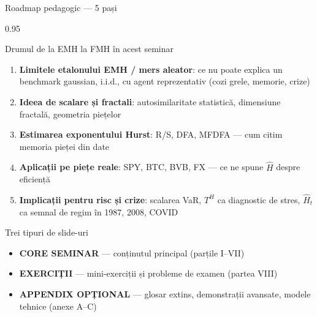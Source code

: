 \documentclass[9pt, aspectratio=169, t]{beamer}
\begin{document}
\begin{frame}[shrink=15]{Roadmap pedagogic --- 5 pași}
\begin{cminipage}{0.95\textwidth}
\begin{block}{Drumul de la EMH la FMH în acest seminar}
\begin{enumerate}\setlength{\itemsep}{4pt}
    \item \textbf{Limitele etalonului EMH / mers aleator}: ce nu poate explica un benchmark gaussian, i.i.d., cu agent reprezentativ (cozi grele, memorie, crize)
    \item \textbf{Ideea de scalare și fractali}: autosimilaritate statistică, dimensiune fractală, geometria piețelor
    \item \textbf{Estimarea exponentului Hurst}: R/S, DFA, MFDFA --- cum citim memoria pieței din date
    \item \textbf{Aplicații pe piețe reale}: SPY, BTC, BVB, FX --- ce ne spune $\hat H$ despre eficiență
    \item \textbf{Implicații pentru risc și crize}: scalarea VaR, $T^H$ ca diagnostic de stres, $\hat H_t$ ca semnal de regim în 1987, 2008, COVID
\end{enumerate}
\end{block}
\begin{exampleblock}{Trei tipuri de slide-uri}
\begin{itemize}\setlength{\itemsep}{0pt}
    \item \textbf{CORE SEMINAR} --- conținutul principal (parțile I--VII)
    \item \textbf{EXERCIȚII} --- mini-exerciții și probleme de examen (partea VIII)
    \item \textbf{APPENDIX OPȚIONAL} --- glosar extins, demonstrații avansate, modele tehnice (anexe A--C)
\end{itemize}
\end{exampleblock}
\end{cminipage}
\end{frame}
\end{document}
